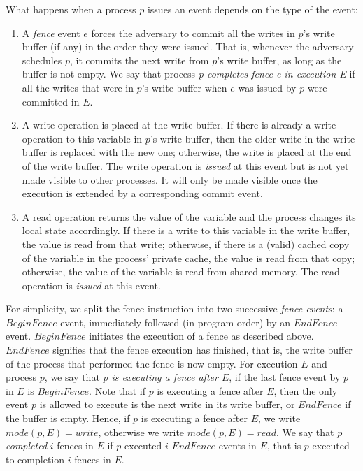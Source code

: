 What happens when a process $p$ issues an event depends on the type of the event:
\begin{enumerate}
	\item A \emph{fence} event $e$ forces the adversary to commit all the writes in $p$'s write buffer (if any) in the order they were issued. That is, whenever the adversary schedules $p$, it commits the next write from $p$'s write buffer, as long as the buffer is not empty. We say that process \emph{p completes fence e in execution E} if all the writes that were in $p$'s write buffer when $e$ was issued by $p$ were committed in $E$.
	\item A write operation is placed at the write buffer. If there is already a write operation to this variable in $p$'s write buffer, then the older write in the write buffer is replaced with the new one; otherwise, the write is placed at the end of the write buffer.
The write operation is \emph{issued} at this event but is not yet made visible to other processes. It will only be made
visible once the execution is extended by a corresponding commit event.
	\item A read operation returns the value of the variable and the process changes its local state accordingly. If there is a write to this variable in the write buffer, the value is read from that write; otherwise, if there is a (valid) cached copy
of the variable in the process' private cache, the value is read from that copy; otherwise, the value of the variable is read from shared memory. The read operation is \emph{issued} at this event.
\end{enumerate}

For simplicity, we split the fence instruction into two successive \emph{fence events}: a $BeginFence$ event, immediately followed (in program order) by an $EndFence$ event. $BeginFence$ initiates the execution of a fence as described above. $EndFence$ signifies that the fence execution has finished, that is, the write buffer of the process that performed the fence is now empty. For execution $E$ and process $p$, we say that \emph{$p$ is
executing a fence after $E$}, if the last fence event by $p$ in $E$ is $BeginFence$. Note that if $p$ is executing a fence after $E$, then the only event $p$ is allowed to execute is the next write in its write buffer, or $EndFence$ if the buffer is empty. Hence, if $p$ is executing a fence after $E$, we write $mode(p,E) = write$, otherwise we write $mode(p,E) = read$. We say that $p$ \emph{completed} $i$ fences in $E$ if $p$ executed $i$ $EndFence$ events in $E$, that is $p$ executed to completion $i$ fences in $E$.

